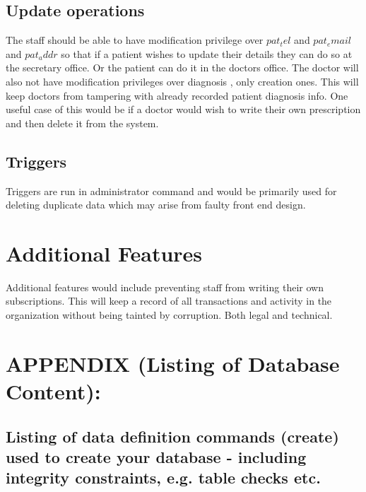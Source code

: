 \documentclass{article}
\begin{document}
\subsection{Update operations}
The staff should be able to have modification privilege over $pat_tel$ and $pat_email$ and $pat_addr$ so that if a patient wishes to update their details they can do so at the secretary office. Or the patient can do it in the doctors office. The doctor will also not have modification privileges over diagnosis , only creation ones. This will keep doctors from tampering with already recorded patient diagnosis info. One useful case of this would be if a doctor would wish to write their own prescription and then delete it from the system.\\


\subsection{Triggers}

Triggers are run in administrator command and would be primarily used for deleting duplicate data which may arise from faulty front end design.


\section{Additional Features}
Additional features would include preventing staff from writing their own subscriptions. This will keep a record of all transactions and activity in the organization without being tainted by corruption. Both legal and technical.

\section{APPENDIX (Listing of Database Content):}
\subsection{Listing of data definition commands (create) used to create your database - including integrity constraints, e.g. table checks etc.}
\end{document}
